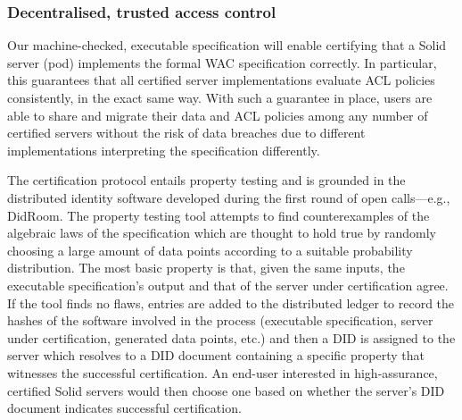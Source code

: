 \subsubsection{Decentralised, trusted access control}
Our machine-checked, executable specification will enable certifying
that a Solid server (pod) implements the formal WAC specification correctly.
In particular, this guarantees that all certified server implementations
evaluate ACL policies consistently, in the exact same way. With such
a guarantee in place, users are able to share and migrate their data
and ACL policies among any number of certified servers without the
risk of data breaches due to different implementations interpreting
the specification differently.

The certification protocol entails property testing\cite{claessen2000quickcheck}
and is grounded in the distributed identity software developed during
the first round of open calls---e.g., DidRoom. The property testing
tool attempts to find counterexamples of the algebraic laws of the
specification which are thought to hold true by randomly choosing a
large amount of data points according to a suitable probability
distribution. The most basic property is that, given the same inputs,
the executable specification's output and that of the server under
certification agree. If the tool finds no flaws, entries are added
to the distributed ledger to record the hashes of the software involved
in the process (executable specification, server under certification,
generated data points, etc.) and then a DID is assigned to the server
which resolves to a DID document containing a specific property that
witnesses the successful certification. An end-user interested in
high-assurance, certified Solid servers would then choose one based
on whether the server's DID document indicates successful certification.
